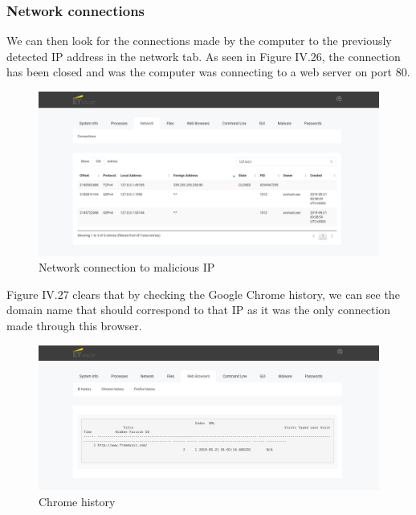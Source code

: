 \subsubsection{Network connections}
We can then look for the connections made by the computer to the previously detected IP address in the network tab. As seen in Figure IV.26, the connection has been closed and was the computer was connecting to a web server on port 80.
\begin{figure}[H]
\centering
\includegraphics[width=0.9\columnwidth]{Figures/26.png}
\caption{Network connection to malicious IP}
\end{figure}
Figure IV.27 clears that by checking the Google Chrome history, we can see the domain name that should correspond to that IP as it was the only connection made through this browser.
\begin{figure}[H]
\centering
\includegraphics[width=0.9\columnwidth]{Figures/27.png}
\caption{Chrome history}
\end{figure}
